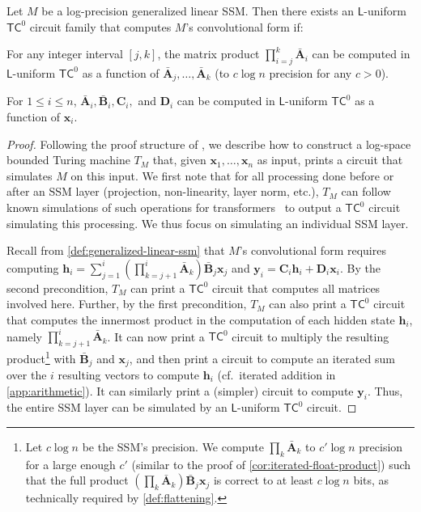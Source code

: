\begin{lemma} \label{lem:general}
    Let $M$ be a log-precision generalized linear SSM. Then there exists an $\mathsf{L}$-uniform $\mathsf{TC}^0$ circuit family that computes $M$'s convolutional form if:
    \begin{compactenum}
        \item For any integer interval $[j, k]$, the matrix product $\prod_{i = j}^k \bar{\mathbf A}_i$ can be computed in $\mathsf{L}$-uniform $\mathsf{TC}^0$ as a function of $\bar{\mathbf A}_j, \ldots, \bar{\mathbf A}_k$ (to $c \log n$ precision for any $c > 0$).
        \item For $1 \leq i \leq n$, $\bar{\mathbf A}_i, \bar{\mathbf B}_i, \mathbf C_i,$ and $\mathbf D_i$ can be computed in $\mathsf{L}$-uniform $\mathsf{TC}^0$ as a function of $\mathbf x_i$.
    \end{compactenum}
\end{lemma}

\begin{proof}
    Following the proof structure of \citet{merrill-sabharwal-2023-parallelism}, we describe how to construct a log-space bounded Turing machine $T_M$ that, given $\mathbf x_1, \ldots, \mathbf x_n$ as input, prints a circuit that simulates $M$ on this input. We first note that for all processing done before or after an SSM layer (projection, non-linearity, layer norm, etc.), $T_M$ can follow known simulations of such operations for transformers~\citep{merrill-sabharwal-2023-parallelism,merrill-sabharwal-2024-cot} to output a $\mathsf{TC}^0$ circuit simulating this processing. We thus focus on simulating an individual SSM layer.

    Recall from \ref{def:generalized-linear-ssm} that $M$'s convolutional form requires computing $\mathbf h_i = \sum_{j=1}^i \left( \prod_{k=j+1}^i \bar{\mathbf A}_k \right) \bar{\mathbf B}_j \mathbf x_j$ and $\mathbf y_i = \mathbf C_i \mathbf h_i + \mathbf D_i \mathbf x_i$. By the second precondition, $T_M$ can print a $\mathsf{TC}^0$ circuit that computes all matrices involved here. Further, by the first precondition, $T_M$ can also print a $\mathsf{TC}^0$ circuit that computes the innermost product in the computation of each hidden state $\mathbf h_i$, namely $\prod_{k=j+1}^i \bar{\mathbf A}_k$. It can now print a $\mathsf{TC}^0$ circuit to multiply the resulting product\footnote{Let $c \log n$ be the SSM's precision. We compute $\prod_k \bar{\mathbf A}_k$ to $c' \log n$ precision for a large enough $c'$ (similar to the proof of \ref{cor:iterated-float-product}) such that the full product $\left( \prod_k \bar{\mathbf A}_k \right) \bar{\mathbf B}_j \mathbf x_j$ is correct to at least $c \log n$ bits, as technically required by \ref{def:flattening}.} with $\bar{\mathbf B}_j$ and $\mathbf x_j$, and then print a circuit to compute an iterated sum over the $i$ resulting vectors to compute $\mathbf h_i$ (cf.~iterated addition in \ref{app:arithmetic}). It can similarly print a (simpler) circuit to compute $\mathbf y_i$. Thus, the entire SSM layer can be simulated by an $\mathsf{L}$-uniform $\mathsf{TC}^0$ circuit.
\end{proof}

